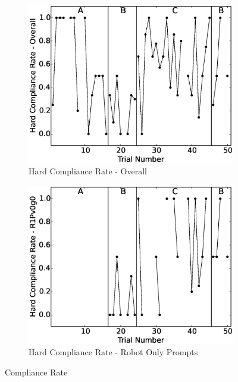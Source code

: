 \documentclass{ut-thesis}
\begin{document}
\begin{figure}[h]
	
	\begin{subfigure}[b]{0.49\textwidth}
		\includegraphics[width=1.1\linewidth]{./img/data_analysis/103HardComplianceRate-Overall.eps}
		\caption{Hard Compliance Rate - Overall}
		\label{fig:103HardComplianceRate-Overall}
	\end{subfigure}
	\hfill
	\begin{subfigure}[b]{0.49\textwidth}
		\includegraphics[width=1.1\linewidth]{./img/data_analysis/92HardComplianceRate-R1Pv0g0.eps}
		\caption{Hard Compliance Rate - Robot Only Prompts}
		\label{fig:92HardComplianceRate-R1Pv0g0}
	\end{subfigure}%
	\caption{Compliance Rate}
	\label{fig:ComplianceRate}
\end{figure}
\end{document}
